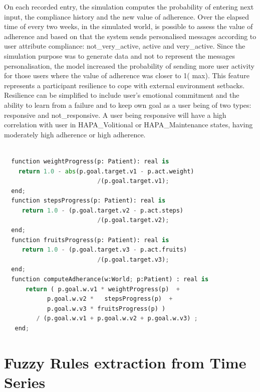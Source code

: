 \documentclass{llncs}
\begin{document}
On each recorded entry, the simulation computes the probability of entering next input, the compliance history and the new value of adherence. Over the elapsed time of every two weeks, in the simulated world,  is possible to assess the value of adherence and based on that the system sends personalised messages according to user attribute compliance: not\_very\_active, active and very\_active. Since the simulation purpose was to generate data and not to represent the messages personalisation, the model increased the probability of sending more user activity for those users where the value of adherence was closer to 1( max).  This feature represents a participant resilience to cope with external environment setbacks. Resilience can be simplified to include user's emotional commitment and the ability to learn from a failure and to keep own goal as a user being of two types: responsive and not\_responsive. A user being responsive will have a high correlation with user in HAPA\_Volitional or HAPA\_Maintenance states, having moderately high adherence or  high adherence.

\begin{lstlisting}[language=Python, caption=Functions used in the Disco specification of Adherence in equation (\ref{Eq.AdheranceFWA})]

  function weightProgress(p: Patient): real is
    return 1.0 - abs(p.goal.target.v1 - p.act.weight)
		                  /(p.goal.target.v1);
  end;
  function stepsProgress(p: Patient): real is
     return 1.0 - (p.goal.target.v2 - p.act.steps)
                          /(p.goal.target.v2);
  end;
  function fruitsProgress(p: Patient): real is
     return 1.0 - (p.goal.target.v3 - p.act.fruits)
                          /(p.goal.target.v3);
  end;
  function computeAdherance(w:World; p:Patient) : real is	 		 
      return ( p.goal.w.v1 * weightProgress(p)  + 
            p.goal.w.v2 *   stepsProgress(p)  +
            p.goal.w.v3 * fruitsProgress(p) )   
         / (p.goal.w.v1 + p.goal.w.v2 + p.goal.w.v3) ;
   end;                    
\end{lstlisting}


\section {Fuzzy Rules extraction from Time Series}
\label{sec.rules}
\end{document}
